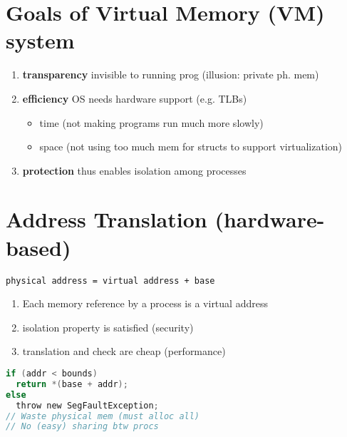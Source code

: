 \section*{Goals of Virtual Memory (VM) system}
\begin{enumerate}
\item \textbf{transparency} invisible to running prog (illusion: private ph. mem)
\item \textbf{efficiency} OS needs hardware support (e.g. TLBs)
  \begin{itemize}
  \item time (not making programs run much more slowly)
  \item space (not using too much mem for structs to support virtualization)
  \end{itemize}
\item \textbf{protection} thus enables isolation among processes
\end{enumerate}
\section*{Address Translation (hardware-based)}
\begin{minipage}{\linewidth}
  \centering
  \texttt{physical address = virtual address + base}
\end{minipage}
\begin{minipage}{0.45\linewidth}
  \begin{enumerate}
  \item Each memory reference by a process is a virtual address
  \item isolation property is satisfied (security)
  \item translation and check are cheap (performance)
  \end{enumerate}
\end{minipage}
\begin{minipage}{.5\linewidth}
  \begin{lstlisting}[language=c,xleftmargin=2pt]
if (addr < bounds)
  return *(base + addr);
else
  throw new SegFaultException;
// Waste physical mem (must alloc all)
// No (easy) sharing btw procs
\end{lstlisting}
\end{minipage}

